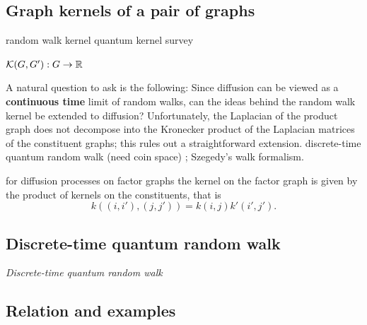 \subsection{Graph kernels of a pair of graphs}
random walk kernel
\cite{vishwanathanGraphKernels2010}
quantum kernel
\cite{baiQuantumJensenShannon2015}
survey
\cite{kriegeSurveyGraphKernels2020}
\begin{definition}\label{def:graph_kernel}
	$\mathcal{K}(G,G'): { G } \to \mathbb{R}$
\end{definition}
\begin{definition}\label{def:product_graphs}
	
\end{definition}
\begin{remark}
	A natural question to ask is the following: Since diffusion can be viewed as a \textbf{continuous time} limit of random walks, can the ideas behind the random walk kernel be extended to diffusion? Unfortunately, the Laplacian of the product graph does not decompose into the Kronecker product of the Laplacian matrices of the constituent graphs; this rules out a straightforward extension.
	discrete-time quantum random walk (need coin space) \cite{ambainisCoinsMakeQuantum2005} \cite{childsQuantumInformationProcessing2004};
	Szegedy's walk formalism.
	\cite{szegedySpectraQuantizedWalks2004}
\end{remark}
\begin{remark}
	for diﬀusion processes on factor graphs the kernel on the factor graph is given by the product of kernels on the constituents, that is 
	\begin{equation}
		k((i, i'), (j, j')) = k(i, j) k' (i' , j' ).
	\end{equation}
\end{remark}

\subsection{Discrete-time quantum random walk}
\emph{Discrete-time quantum random walk}

\subsection{Relation and examples}
